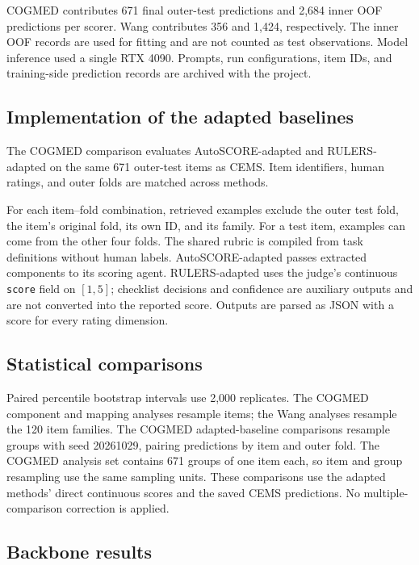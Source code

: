 COGMED contributes 671 final outer-test predictions and 2,684 inner OOF predictions per scorer. Wang contributes 356 and 1,424, respectively. The inner OOF records are used for fitting and are not counted as test observations. Model inference used a single RTX 4090. Prompts, run configurations, item IDs, and training-side prediction records are archived with the project.

\subsection{Implementation of the adapted baselines}
\label{sec:adapter_details}

The COGMED comparison evaluates AutoSCORE-adapted and RULERS-adapted on the same 671 outer-test items as CEMS. Item identifiers, human ratings, and outer folds are matched across methods.

For each item--fold combination, retrieved examples exclude the outer test fold, the item's original fold, its own ID, and its family. For a test item, examples can come from the other four folds. The shared rubric is compiled from task definitions without human labels. AutoSCORE-adapted passes extracted components to its scoring agent. RULERS-adapted uses the judge's continuous \texttt{score} field on $[1,5]$; checklist decisions and confidence are auxiliary outputs and are not converted into the reported score. Outputs are parsed as JSON with a score for every rating dimension.

\subsection{Statistical comparisons}
\label{sec:bootstrap_details}

Paired percentile bootstrap intervals use 2,000 replicates. The COGMED component and mapping analyses resample items; the Wang analyses resample the 120 item families. The COGMED adapted-baseline comparisons resample groups with seed 20261029, pairing predictions by item and outer fold. The COGMED analysis set contains 671 groups of one item each, so item and group resampling use the same sampling units. These comparisons use the adapted methods' direct continuous scores and the saved CEMS predictions. No multiple-comparison correction is applied.

\subsection{Backbone results}


